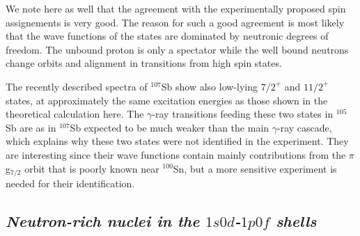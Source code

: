 \documentclass{article}
\begin{document}
We note here as well that
the agreement with the experimentally 
proposed spin assignements is very good.
The reason for such a good
agreement is most likely that the wave functions of the 
states are dominated by neutronic degrees of freedom.
The unbound proton is 
only a spectator
while the well bound neutrons change orbits and alignment
in transitions from high spin states.

The recently described spectra of $^{107}$Sb show also
low-lying $7/2^+$ and $11/2^+$ states, at approximately the 
same excitation energies as those shown in the theoretical calculation 
here. The $\gamma$-ray transitions feeding these two states in 
$^{105}$Sb are as in $^{107}$Sb expected to be much weaker than 
the main $\gamma$-ray cascade, which explains why these two states
were not identified in the experiment. They are interesting since
their wave functions contain mainly contributions from the $\pi$g$_{7/2}$
orbit that is poorly known near $^{100}$Sn, but
a more sensitive experiment
is needed for their identification.

\subsection{\it Neutron-rich nuclei in the $1s0d$-$1p0f$ shells}\label{subsec:sdpfshells}
\end{document}
